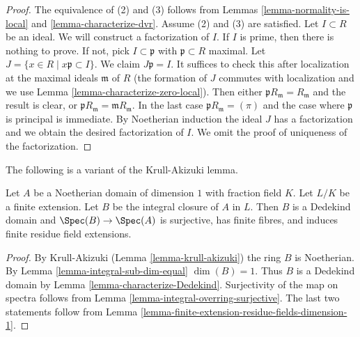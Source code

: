 \begin{proof}
\medskip\noindent
The equivalence of (2) and (3) follows from
Lemmas \ref{lemma-normality-is-local} and
\ref{lemma-characterize-dvr}. Assume (2) and (3) are satisfied.
Let $I \subset R$ be an ideal. We will construct a factorization
of $I$. If $I$ is prime, then there is nothing to prove.
If not, pick $I \subset \mathfrak p$ with $\mathfrak p \subset R$
maximal. Let $J = \{x \in R \mid x \mathfrak p \subset I\}$.
We claim $J \mathfrak p = I$. It suffices to check this after localization
at the maximal ideals $\mathfrak m$ of $R$ (the formation of $J$ commutes with
localization and we use Lemma \ref{lemma-characterize-zero-local}).
Then either $\mathfrak p R_\mathfrak m = R_\mathfrak m$ and the result
is clear, or $\mathfrak p R_\mathfrak m = \mathfrak m R_\mathfrak m$.
In the last case $\mathfrak p R_\mathfrak m = (\pi)$ and the case where
$\mathfrak p$ is principal is immediate. By Noetherian induction the
ideal $J$ has a factorization and we obtain the desired factorization
of $I$. We omit the proof of uniqueness of the factorization.
\end{proof}

\noindent
The following is a variant of the Krull-Akizuki lemma.

\begin{lemma}
\label{lemma-integral-closure-Dedekind}
Let $A$ be a Noetherian domain of dimension $1$ with fraction field $K$.
Let $L/K$ be a finite extension. Let $B$ be the
integral closure of $A$ in $L$. Then $B$ is a Dedekind domain and
$\Spec(B) \to \Spec(A)$ is surjective, has finite fibres, and
induces finite residue field extensions.
\end{lemma}

\begin{proof}
By Krull-Akizuki (Lemma \ref{lemma-krull-akizuki})
the ring $B$ is Noetherian. By Lemma \ref{lemma-integral-sub-dim-equal}
$\dim(B) = 1$. Thus $B$ is a Dedekind domain by
Lemma \ref{lemma-characterize-Dedekind}.
Surjectivity of the map on spectra follows from
Lemma \ref{lemma-integral-overring-surjective}.
The last two statements follow from
Lemma \ref{lemma-finite-extension-residue-fields-dimension-1}.
\end{proof}







